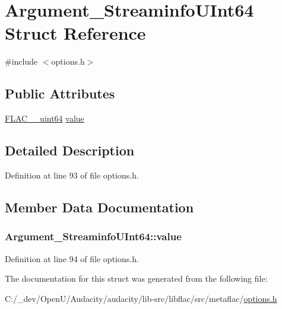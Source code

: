 \hypertarget{struct_argument___streaminfo_u_int64}{}\section{Argument\+\_\+\+Streaminfo\+U\+Int64 Struct Reference}
\label{struct_argument___streaminfo_u_int64}


{\ttfamily \#include $<$options.\+h$>$}

\subsection*{Public Attributes}
\begin{DoxyCompactItemize}
\item 
\hyperlink{ordinals_8h_aa78c8c70a3eb8a58af7436f278acde8e}{F\+L\+A\+C\+\_\+\+\_\+uint64} \hyperlink{struct_argument___streaminfo_u_int64_a0de83e2482fcf9b766e26ac3fdfa33ba}{value}
\end{DoxyCompactItemize}


\subsection{Detailed Description}


Definition at line 93 of file options.\+h.



\subsection{Member Data Documentation}
\subsubsection[{\texorpdfstring{value}{value}}]{ Argument\+\_\+\+Streaminfo\+U\+Int64\+::value}\hypertarget{struct_argument___streaminfo_u_int64_a0de83e2482fcf9b766e26ac3fdfa33ba}{}\label{struct_argument___streaminfo_u_int64_a0de83e2482fcf9b766e26ac3fdfa33ba}


Definition at line 94 of file options.\+h.



The documentation for this struct was generated from the following file\+:\begin{DoxyCompactItemize}
\item 
C\+:/\+\_\+dev/\+Open\+U/\+Audacity/audacity/lib-\/src/libflac/src/metaflac/\hyperlink{libflac_2src_2metaflac_2options_8h}{options.\+h}\end{DoxyCompactItemize}
